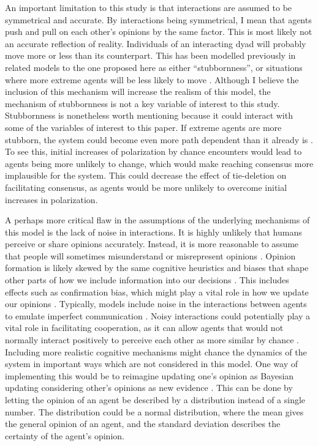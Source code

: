 \documentclass{article}
\begin{document}
An important limitation to this study is that interactions are assumed to be symmetrical and accurate. 
By interactions being symmetrical, I mean that agents push and pull on each other’s opinions by the same factor. 
This is most likely not an accurate reflection of reality. 
Individuals of an interacting dyad will probably move more or less than its counterpart. 
This has been modelled previously in related models to the one proposed here as either “stubbornness”, or situations where more extreme agents will be less likely to move \cite{flache_models_2017,ghaderi_opinion_2014,yildiz_binary_2013}. 
Although I believe the inclusion of this mechanism will increase the realism of this model, the mechanism of stubbornness is not a key variable of interest to this study. 
Stubbornness is nonetheless worth mentioning because it could interact with some of the variables of interest to this paper. 
If extreme agents are more stubborn, the system could become even more path dependent than it already is \cite{turner_paths_2018}. 
To see this, initial increases of polarization by chance encounters would lead to agents being more unlikely to change, which would make reaching consensus more implausible for the system. This could decrease the effect of tie-deletion on facilitating consensus, as agents would be more unlikely to overcome initial increases in polarization. 

A perhaps more critical flaw in the assumptions of the underlying mechanisms of this model is the lack of noise in interactions. 
It is highly unlikely that humans perceive or share opinions accurately. 
Instead, it is more reasonable to assume that people will sometimes misunderstand or misrepresent opinions \cite{jussim_influence_1989}. 
Opinion formation is likely skewed by the same cognitive heuristics and biases that shape other parts of how we include information into our decisions \cite{arceneaux_cognitive_2012}. This includes effects such as confirmation bias, which might play a vital role in how we update our opinions \cite{allahverdyan_opinion_2014}. 
Typically, models include noise in the interactions between agents to emulate imperfect communication \cite{sirbu2017opinion,su_noise_2017}. Noisy interactions could potentially play a vital role in facilitating cooperation, as it can allow agents that would not normally interact positively to perceive each other as more similar by chance \cite{allahverdyan_opinion_2014,su_noise_2017}. Including more realistic cognitive mechanisms might chance the dynamics of the system in important ways which are not considered in this model. 
One way of implementing this would be to reimagine updating one’s opinion as Bayesian updating considering other’s opinions as new evidence \cite{allahverdyan_opinion_2014}. This can be done by letting the opinion of an agent be described by a distribution instead of a single number. The distribution could be a normal distribution, where the mean gives the general opinion of an agent, and the standard deviation describes the certainty of the agent’s opinion.  
\end{document}
